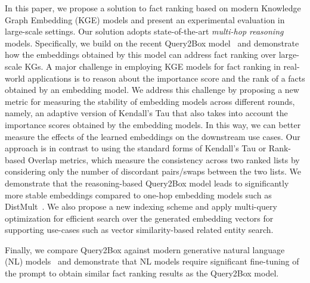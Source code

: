 In this paper, we propose a solution to fact ranking based on modern Knowledge Graph Embedding (KGE) models and present an experimental evaluation in large-scale settings. Our solution adopts state-of-the-art \emph{multi-hop reasoning} models. Specifically, we build on the recent Query2Box model~\cite{ren2020query2box} and demonstrate how the embeddings obtained by this model can address fact ranking over large-scale KGs. A major challenge in employing KGE models for fact ranking in real-world applications is to reason about the importance score and the rank of a facts obtained by an embedding model. We address this challenge by proposing a new metric for measuring the stability of embedding models across different rounds, namely, an adaptive version of Kendall's Tau that also takes into account the importance scores obtained by the embedding models. In this way, we can better measure the effects of the learned embeddings on the downstream use cases. Our approach is in contrast to using the standard forms of Kendall's Tau or Rank-based Overlap metrics, which measure the consistency across two ranked lists by considering only the number of discordant pairs/swaps between the two lists. We demonstrate that the reasoning-based Query2Box model leads to significantly more stable embeddings compared to one-hop embedding models such as DistMult~\cite{distmult}. We also propose a new indexing scheme and apply multi-query optimization for efficient search over the generated embedding vectors for supporting use-cases such as vector similarity-based related entity search.


Finally, we compare Query2Box against modern generative natural language (NL) models~\cite{liu2019roberta} and demonstrate that NL models require significant fine-tuning of the prompt to obtain similar fact ranking results as the Query2Box model.
